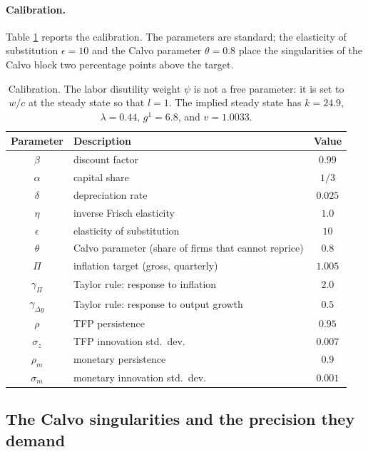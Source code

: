\documentclass[11pt]{article}
\begin{document}
\paragraph{Calibration.} Table \ref{tab:calibration} reports the calibration. The parameters are standard; the elasticity of substitution $\epsilon = 10$ and the Calvo parameter $\theta = 0.8$ place the singularities of the Calvo block two percentage points above the target. 
\begin{table}[ht]
\centering
\small
\begin{tabular}{clc}
\toprule
Parameter & Description & Value\\
\midrule
$\beta$ & discount factor & $0.99$\\
$\alpha$ & capital share & $1/3$\\
$\delta$ & depreciation rate & $0.025$\\
$\eta$ & inverse Frisch elasticity & $1.0$\\
$\epsilon$ & elasticity of substitution & $10$\\
$\theta$ & Calvo parameter (share of firms that cannot reprice) & $0.8$\\
$\Pi$ & inflation target (gross, quarterly) & $1.005$\\
$\gamma_{\Pi}$ & Taylor rule: response to inflation & $2.0$\\
$\gamma_{\Delta y}$ & Taylor rule: response to output growth & $0.5$\\
$\rho$ & TFP persistence & $0.95$\\
$\sigma_{z}$ & TFP innovation std.\ dev. & $0.007$\\
$\rho_{m}$ & monetary persistence & $0.9$\\
$\sigma_{m}$ & monetary innovation std.\ dev. & $0.001$\\
\bottomrule
\end{tabular}
\caption{Calibration. The labor disutility weight $\psi$ is not a free parameter: it is set to $w/c$ at the steady state so that $l = 1$. The implied steady state has $k = 24.9$, $\lambda = 0.44$, $g^1 = 6.8$, and $v = 1.0033$.}
\label{tab:calibration}
\end{table}

\subsection{The Calvo singularities and the precision they demand}
\label{sec:singularities}
\end{document}
